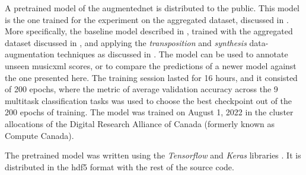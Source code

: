 
A pretrained model of the \gls{augmentednet} is distributed
to the public. This model is the one trained for the
experiment on the aggregated dataset, discussed in
. More specifically,
the baseline model described in ,
trained with the aggregated dataset discussed in
, and applying the
\emph{transposition} and \emph{synthesis} data-augmentation
techniques as discussed in
. The model can be used
to annotate unseen \gls{musicxml} scores, or to compare the
predictions of a newer model against the one presented here.
The training session lasted for 16 hours, and it consisted
of 200 epochs, where the metric of average validation
accuracy across the 9 multitask classification tasks was
used to choose the best checkpoint out of the 200 epochs of
training. The model was trained on August 1, 2022 in the
cluster allocations of the Digital Research Alliance of
Canada (formerly known as Compute Canada).

The pretrained model was written using the \emph{Tensorflow}
and \emph{Keras} libraries \parencite{abadi2016tensorflow,
chollet2021deep}. It is distributed in the \gls{hdf5} format
with the rest of the source
code. 
